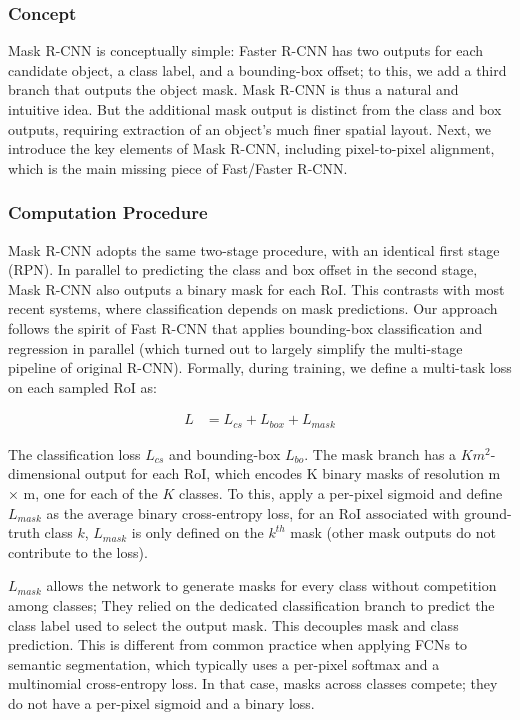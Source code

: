 \documentclass[a4paper, openany]{book}
\begin{document}
\subsubsection{Concept}
	\vspace{0.3cm}
Mask R-CNN is conceptually simple: Faster R-CNN has two outputs for each candidate object, a class label, and a bounding-box offset; to this, we add a third branch that outputs the object mask. Mask R-CNN is thus a natural and intuitive idea. But the additional mask output is distinct from the class and box outputs, requiring extraction of an object's much finer spatial layout. Next, we introduce the key elements of Mask R-CNN, including pixel-to-pixel alignment, which is the main missing piece of Fast/Faster R-CNN.
\newpage

\subsubsection{Computation Procedure}
	\vspace{0.3cm}
	
Mask R-CNN adopts the same two-stage procedure, with an identical first stage (RPN). In parallel to predicting the class and box offset in the second stage, Mask R-CNN also outputs a binary mask for each RoI. This contrasts with most recent systems, where classification depends on mask predictions. Our approach follows the spirit of Fast R-CNN that applies bounding-box classification and regression in parallel (which turned out to largely simplify the multi-stage pipeline of original R-CNN). Formally, during training, we define a multi-task loss on each sampled RoI as:

\begin{eqnarray*}
L &= L_{cs} +L_{box}+L_{mask}
\end{eqnarray*}

The classification loss $L_{cs}$ and bounding-box $L_{bo}$. The mask branch has a $Km^2$-dimensional output for each RoI, which encodes K binary masks of resolution m × m, one for each of the $K$ classes. To this, apply a per-pixel sigmoid and define $L_{mask}$ as the average binary cross-entropy loss, for an RoI associated with ground-truth class $k$, $L_{mask}$ is only defined on the $k^{th}$ mask (other mask outputs do not contribute to the loss).

$L_{mask}$ allows the network to generate masks for every class without competition among classes; They relied on the dedicated classification branch to predict the class label used to select the output mask. This decouples mask and class prediction. This is different from common practice when applying FCNs to semantic segmentation, which typically uses a per-pixel softmax and a multinomial cross-entropy loss. In that case, masks across classes compete; they do not have a per-pixel sigmoid and a binary loss.
\end{document}
